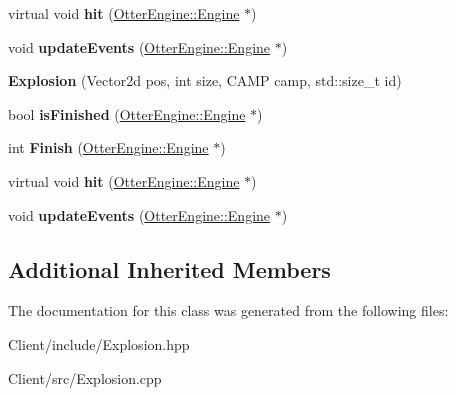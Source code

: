 \begin{DoxyCompactItemize}
\item 
virtual void {\bfseries hit} (\hyperlink{class_otter_engine_1_1_engine}{Otter\+Engine\+::\+Engine} $\ast$)\hypertarget{class_explosion_a27547401f4d0d53eabff58e6ed139722}{}\label{class_explosion_a27547401f4d0d53eabff58e6ed139722}

\item 
void {\bfseries update\+Events} (\hyperlink{class_otter_engine_1_1_engine}{Otter\+Engine\+::\+Engine} $\ast$)\hypertarget{class_explosion_a4f2f2c61984726ce7031d4d25c166fc6}{}\label{class_explosion_a4f2f2c61984726ce7031d4d25c166fc6}

\item 
{\bfseries Explosion} (Vector2d pos, int size, C\+A\+MP camp, std\+::size\+\_\+t id)\hypertarget{class_explosion_ae909d28a6a9f73fc516a0b4a021ab436}{}\label{class_explosion_ae909d28a6a9f73fc516a0b4a021ab436}

\item 
bool {\bfseries is\+Finished} (\hyperlink{class_otter_engine_1_1_engine}{Otter\+Engine\+::\+Engine} $\ast$)\hypertarget{class_explosion_a8a3e5c28398cc58604932d0d2eec96f7}{}\label{class_explosion_a8a3e5c28398cc58604932d0d2eec96f7}

\item 
int {\bfseries Finish} (\hyperlink{class_otter_engine_1_1_engine}{Otter\+Engine\+::\+Engine} $\ast$)\hypertarget{class_explosion_a4661fe3a249eca547e9a805e34354cb6}{}\label{class_explosion_a4661fe3a249eca547e9a805e34354cb6}

\item 
virtual void {\bfseries hit} (\hyperlink{class_otter_engine_1_1_engine}{Otter\+Engine\+::\+Engine} $\ast$)\hypertarget{class_explosion_a27547401f4d0d53eabff58e6ed139722}{}\label{class_explosion_a27547401f4d0d53eabff58e6ed139722}

\item 
void {\bfseries update\+Events} (\hyperlink{class_otter_engine_1_1_engine}{Otter\+Engine\+::\+Engine} $\ast$)\hypertarget{class_explosion_a4f2f2c61984726ce7031d4d25c166fc6}{}\label{class_explosion_a4f2f2c61984726ce7031d4d25c166fc6}

\end{DoxyCompactItemize}
\subsection*{Additional Inherited Members}


The documentation for this class was generated from the following files\+:\begin{DoxyCompactItemize}
\item 
Client/include/Explosion.\+hpp\item 
Client/src/Explosion.\+cpp\end{DoxyCompactItemize}
